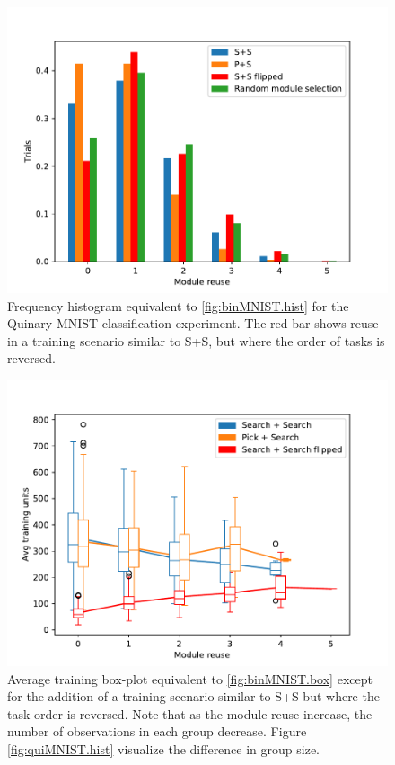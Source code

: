\begin{figure}[t]
    \includegraphics[width=\textwidth]{Chapters/4.Experiments/exp1/figures/QUIN_module_reuse.pdf}
    \caption[Module reuse for quinary MNIST classification]{Frequency histogram equivalent to \ref{fig:binMNIST.hist} for the Quinary MNIST classification experiment. The red bar shows reuse in a training scenario similar to S+S, but where the order of tasks is reversed.}
    \label{fig:quinMNIST.hist}
\end{figure}

\begin{figure}[t]
    \includegraphics[width=\textwidth]{Chapters/4.Experiments/exp1/figures/QUIN_training_boxplot.pdf}
    \caption[Training boxplot for quinary MNIST classification]{Average training box-plot equivalent to \ref{fig:binMNIST.box} except for the addition of a training scenario similar to S+S but where the task order is reversed. Note that as the module reuse increase, the number of observations in each group decrease. Figure \ref{fig:quiMNIST.hist} visualize the difference in group size.}
    \label{fig:quinMNIST.box}
\end{figure}


